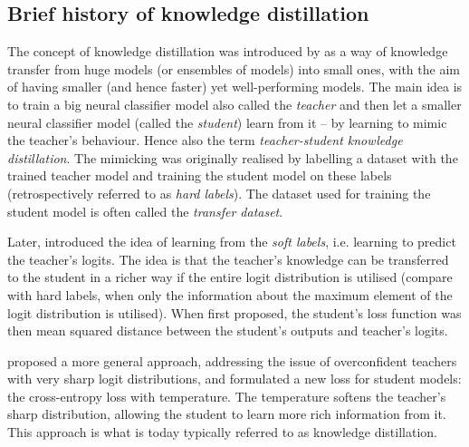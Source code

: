 \documentclass[bsc,frontabs,twoside,singlespacing,parskip,deptreport]{infthesis}
\begin{document}
{{    \subsection{Brief history of knowledge distillation}{
      The concept of knowledge distillation was introduced by \citep{Bucila_2006} as a way of knowledge transfer from huge models (or ensembles of models) into small ones, with the aim of having smaller (and hence faster) yet well-performing models.
      The main idea is to train a big neural classifier model also called the \textit{teacher} and then let a smaller neural classifier model (called the \textit{student}) learn from it -- by learning to mimic the teacher's behaviour. Hence also the term \textit{teacher-student knowledge distillation}.
      The mimicking was originally realised by labelling a dataset with the trained teacher model and training the student model on these labels (retrospectively referred to as \textit{hard labels}). The dataset used for training the student model is often called the \textit{transfer dataset}.

      Later, \citet{Ba_2013} introduced the idea of learning from the \textit{soft labels}, i.e. learning to predict the teacher's logits. The idea is that the teacher's knowledge can be transferred to the student in a richer way if the entire logit distribution is utilised (compare with hard labels, when only the information about the maximum element of the logit distribution is utilised). When first proposed, the student's loss function was then mean squared distance between the student's outputs and teacher's logits.

      \citet{Hinton_2015} proposed a more general approach, addressing the issue of overconfident teachers with very sharp logit distributions, and formulated a new loss for student models: the cross-entropy loss with temperature. The temperature softens the teacher's sharp distribution, allowing the student to learn more rich information from it. This approach is what is today typically referred to as knowledge distillation.

}}}
\end{document}
